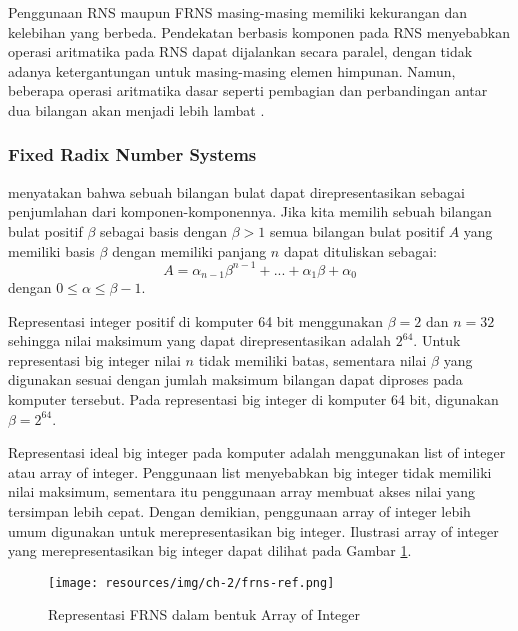     Penggunaan RNS maupun FRNS masing-masing memiliki kekurangan dan kelebihan yang berbeda. Pendekatan berbasis komponen pada RNS menyebabkan operasi aritmatika pada RNS dapat dijalankan secara paralel, dengan tidak adanya ketergantungan untuk masing-masing elemen himpunan. Namun, beberapa operasi aritmatika dasar seperti pembagian dan perbandingan antar dua bilangan akan menjadi lebih lambat \citep{gpu_bignum}.

    \subsubsection{Fixed Radix Number Systems} \label{sec:frns}

    \citet{modern_comp_math} menyatakan bahwa sebuah bilangan bulat dapat direpresentasikan sebagai penjumlahan dari komponen-komponennya. Jika kita memilih sebuah bilangan bulat positif $\beta$ sebagai basis dengan $\beta > 1 $ semua bilangan bulat positif $A$ yang memiliki basis $\beta$ dengan memiliki panjang $n$ dapat dituliskan sebagai:
    \begin{equation} \label{eq:frns_rep}
      A = \alpha_{n-1}\beta^{n-1}+...+\alpha_{1}\beta+\alpha_{0}
    \end{equation}
    dengan $0 \leq \alpha \leq \beta -1$.

    Representasi integer positif di komputer 64 bit menggunakan $\beta = 2$ dan $n = 32$ sehingga nilai maksimum yang dapat direpresentasikan adalah $2^{64}$. Untuk representasi big integer nilai $n$ tidak memiliki batas, sementara nilai $\beta$ yang digunakan sesuai dengan jumlah maksimum bilangan dapat diproses pada komputer tersebut. Pada representasi big integer di komputer 64 bit, digunakan $\beta = 2^{64}$.

    Representasi ideal big integer pada komputer adalah menggunakan list of integer atau array of integer. Penggunaan list menyebabkan big integer tidak memiliki nilai maksimum, sementara itu penggunaan array membuat akses nilai yang tersimpan lebih cepat. Dengan demikian, penggunaan array of integer lebih umum digunakan untuk merepresentasikan big integer. Ilustrasi array of integer yang merepresentasikan big integer dapat dilihat pada Gambar \ref{fig:frns_ref}.

    \begin{figure}[h]
      \centering
      \texttt{[image: resources/img/ch-2/frns-ref.png]}
      \caption{Representasi FRNS dalam bentuk Array of Integer}
      \label{fig:frns_ref}
    \end{figure}

